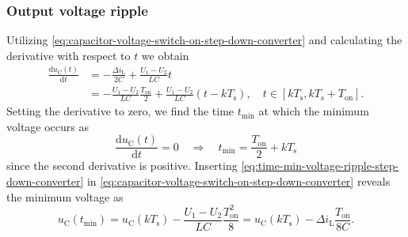 \begin{frame}[fragile]
\begin{figure}
    \end{figure}
\end{frame}


\begin{frame}
    \frametitle{Output voltage ripple}
    Utilizing \eqref{eq:capacitor-voltage-switch-on-step-down-converter} and calculating the derivative with respect to $t$ we obtain
    \begin{equation}
        \begin{split}
            \frac{\mathrm{d}u_\mathrm{C}(t)}{\mathrm{d}t} &= -\frac{\Delta i_\mathrm{L}}{2 C} + \frac{U_1-U_2}{LC} t\\
                                                          &= -\frac{U_1-U_2}{LC}\frac{T_\mathrm{on}}{2} +\frac{U_1-U_2}{LC} (t-kT_\mathrm{s}), \quad t\in [k T_\mathrm{s}, k T_\mathrm{s} + T_\mathrm{on}].
        \end{split}
    \end{equation}
    Setting the derivative to zero, we find the time $t_\mathrm{min}$ at which the minimum voltage occurs as
    \begin{equation}
        \frac{\mathrm{d}u_\mathrm{C}(t)}{\mathrm{d}t} = 0 \quad \Rightarrow \quad t_\mathrm{min} = \frac{T_\mathrm{on}}{2} + kT_\mathrm{s}
        \label{eq:time-min-voltage-ripple-step-down-converter}
    \end{equation}
    since the second derivative is positive. Inserting \eqref{eq:time-min-voltage-ripple-step-down-converter} in \eqref{eq:capacitor-voltage-switch-on-step-down-converter} reveals the minimum voltage as
    \begin{equation}
        u_\mathrm{C}(t_\mathrm{min}) = u_\mathrm{C}(kT_\mathrm{s}) - \frac{U_1-U_2}{LC} \frac{T_\mathrm{on}^2}{8} = u_\mathrm{C}(kT_\mathrm{s}) - \Delta i_\mathrm{L}\frac{T_\mathrm{on}}{8C}.
    \end{equation}
\end{frame}

